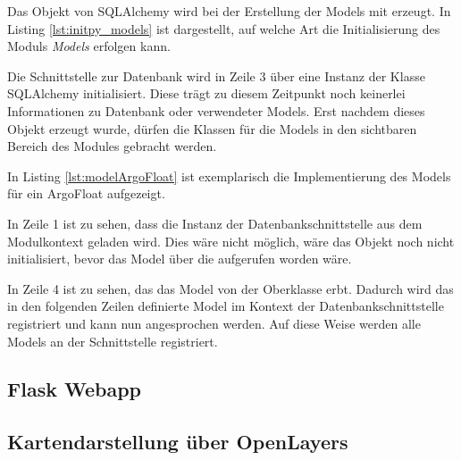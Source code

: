 Das Objekt von SQLAlchemy wird bei der Erstellung der Models mit erzeugt.
In Listing \ref{lst:initpy_models} ist dargestellt, auf welche Art die Initialisierung des Moduls \textit{Models} erfolgen kann. 

    
Die Schnittstelle zur Datenbank wird in Zeile 3 über eine Instanz der Klasse SQLAlchemy initialisiert. Diese trägt zu diesem Zeitpunkt noch keinerlei Informationen zu Datenbank oder verwendeter Models.
Erst nachdem dieses Objekt erzeugt wurde, dürfen die Klassen für die Models in den sichtbaren Bereich des Modules gebracht werden. 

In Listing \ref{lst:modelArgoFloat} ist exemplarisch die Implementierung des Models für ein ArgoFloat aufgezeigt.

    
In Zeile 1 ist zu sehen, dass die Instanz der Datenbankschnittstelle aus dem Modulkontext geladen wird. Dies wäre nicht möglich, wäre das Objekt noch nicht initialisiert, bevor das Model über die  aufgerufen worden wäre. 

In Zeile 4 ist zu sehen, das das Model von der Oberklasse  erbt. Dadurch wird das in den folgenden Zeilen definierte Model im Kontext der Datenbankschnittstelle registriert und kann nun angesprochen werden. Auf diese Weise werden alle Models an der Schnittstelle registriert. 




\subsection{Flask Webapp}

\subsection{Kartendarstellung über OpenLayers}








